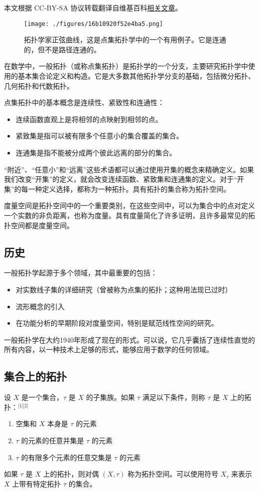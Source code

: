 
本文根据 CC-BY-SA 协议转载翻译自维基百科\href{https://en.wikipedia.org/wiki/General_topology}{相关文章}。

\begin{figure}[ht]
\centering
\texttt{[image: ./figures/16b10920f52e4ba5.png]}
\caption{拓扑学家正弦曲线，这是点集拓扑学中的一个有用例子。它是连通的，但不是路径连通的。} \label{fig_DJTP_1}
\end{figure}
在数学中，一般拓扑（或称点集拓扑）是拓扑学的一个分支，主要研究拓扑学中使用的基本集合论定义和构造。它是大多数其他拓扑学分支的基础，包括微分拓扑、几何拓扑和代数拓扑。

点集拓扑中的基本概念是连续性、紧致性和连通性：
\begin{itemize}
\item 连续函数直观上是将相邻的点映射到相邻的点。
\item 紧致集是指可以被有限多个任意小的集合覆盖的集合。
\item 连通集是指不能被分成两个彼此远离的部分的集合。
\end{itemize}
“附近”、“任意小”和“远离”这些术语都可以通过使用开集的概念来精确定义。如果我们改变“开集”的定义，就会改变连续函数、紧致集和连通集的定义。对于“开集”的每一种定义选择，都称为一种拓扑。具有拓扑的集合称为拓扑空间。

度量空间是拓扑空间中的一个重要类别，在这些空间中，可以为集合中的点对定义一个实数的非负距离，也称为度量。具有度量简化了许多证明，且许多最常见的拓扑空间都是度量空间。
\subsection{历史}
一般拓扑学起源于多个领域，其中最重要的包括：
\begin{itemize}
\item 对实数线子集的详细研究（曾被称为点集的拓扑；这种用法现已过时）
\item 流形概念的引入
\item 在功能分析的早期阶段对度量空间，特别是赋范线性空间的研究。
\end{itemize}
一般拓扑学在大约1940年形成了现在的形式。可以说，它几乎囊括了连续性直觉的所有内容，以一种技术上足够的形式，能够应用于数学的任何领域。
\subsection{集合上的拓扑}
设 $X$ 是一个集合，$\tau$ 是 $X$ 的子集族。如果 $\tau$ 满足以下条件，则称 $\tau$ 是 $X$ 上的拓扑：\(^\text{[1][2]}\)
\begin{enumerate}
\item 空集和 $X$ 本身是 $\tau$ 的元素
\item $\tau$ 的元素的任意并集是 $\tau$ 的元素
\item $\tau$ 的有限多个元素的任意交集是 $\tau$ 的元素
\end{enumerate}
如果 $\tau$ 是 $X$ 上的拓扑，则对偶 $(X, \tau)$ 称为拓扑空间。可以使用符号 $X_\tau$ 来表示 $X$ 上带有特定拓扑 $\tau$ 的集合。

